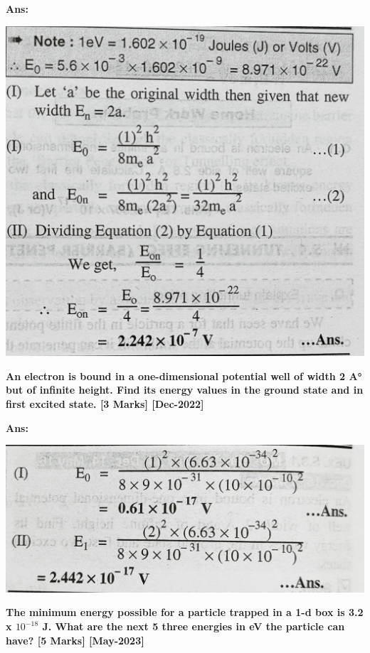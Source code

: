 \documentclass{exam}
\begin{document}
\begin{questions}
\textbf{Ans:} 
\begin{center}
\includegraphics[scale=0.3]{Q15.jpeg}
\end{center}


\question \textbf{An electron is bound in a one-dimensional potential well of width 2 A° but of infinite height. Find its energy values in the ground state and in first excited state. \hfil [3 Marks] [Dec-2022] }

\textbf{Ans:} 
\begin{center}
	\includegraphics[scale=0.3]{Q16.jpeg}
\end{center}

\newpage
\question \textbf{The minimum energy possible for a particle trapped in a 1-d box is 3.2 x $10^{-18}$  J. What are the next 5 three energies in eV the particle can have? \hfil  [5 Marks] [May-2023] }


\end{questions}
\end{document}
